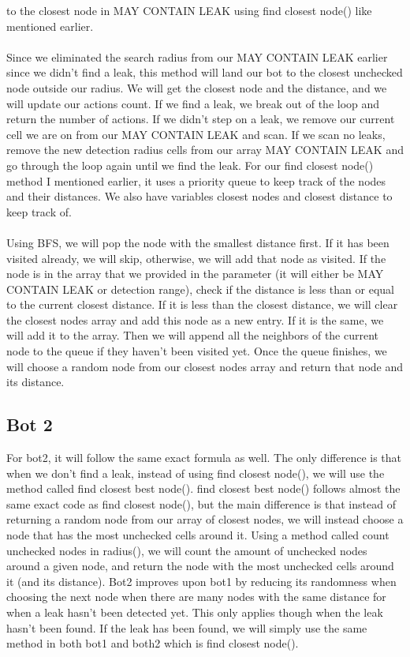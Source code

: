 \documentclass[12pt]{article}
\begin{document}
to the closest node in MAY CONTAIN LEAK using find closest node() like mentioned earlier.
\\
\\ 
Since we eliminated the search radius from our MAY CONTAIN LEAK earlier since we didn't find a leak, 
this method will land our bot to the closest unchecked node outside our radius. 
We will get the closest node and the distance, and we will update our actions count. If we find a leak, 
we break out of the loop and return the number of actions. If we didn't step on a leak, we 
remove our current cell we are on from our MAY CONTAIN LEAK and scan. If we scan no leaks, 
remove the new detection radius cells from our array MAY CONTAIN LEAK and go through the loop again 
until we find the leak. For our find closest node() method I mentioned earlier, it uses a priority queue 
to keep track of the nodes and their distances. We also have variables closest nodes and closest distance 
to keep track of. 
\\
\\
Using BFS, we will pop the node with the smallest distance first. If it has been visited 
already, we will skip, otherwise, we will add that node as visited. If the node is in the array that we 
provided in the parameter (it will either be MAY CONTAIN LEAK or detection range), check if the distance 
is less than or equal to the current closest distance. If it is less than the closest distance, we will 
clear the closest nodes array and add this node as a new entry. If it is the same, we will add it to the 
array. Then we will append all the neighbors of the current node to the queue if they haven't been visited 
yet. Once the queue finishes, we will choose a random node from our closest nodes array and return that 
node and its distance. 

\subsection*{Bot 2}
For bot2, it will follow the same exact formula as well. The only difference is that when we don't 
find a leak, instead of using find closest node(), we will use the method called find closest best node().
 find closest best node() follows almost the same exact code as find closest node(), but the 
 main difference is that instead of returning a random node from our array of closest nodes, we 
 will instead choose a node that has the most unchecked cells around it. Using a method called 
 count unchecked nodes in radius(), we will count the amount of unchecked nodes around a given node, 
 and return the node with the most unchecked cells around it (and its distance). Bot2 improves upon 
 bot1 by reducing its randomness when choosing the next node when there are many nodes with the same 
 distance for when a leak hasn't been detected yet. This only applies though when the leak hasn't been 
 found. If the leak has been found, we will simply use the same method in both bot1 and both2 
 which is find closest node().
\end{document}
